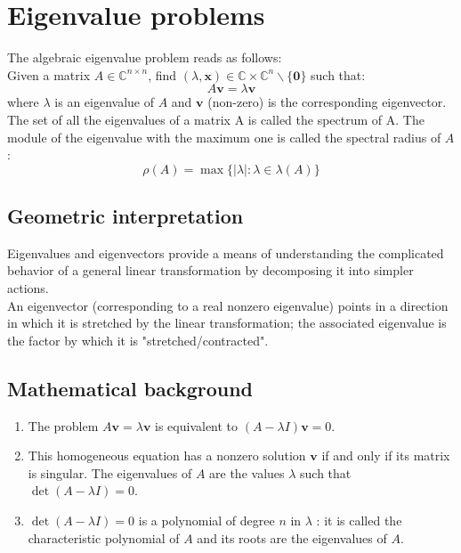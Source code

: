 \documentclass[11pt]{book}
\begin{document}
\newpage 
\chapter{Eigenvalue problems}
The algebraic eigenvalue problem reads as follows:\\
Given a matrix $A \in \mathbb{C}^{n \times n}$, find $(\lambda, \mathbf{x}) \in \mathbb{C} \times \mathbb{C}^{n} \backslash\{\mathbf{0}\}$ such that:
$$
A \mathbf{v}=\lambda \mathbf{v}
$$
where $\lambda$ is an eigenvalue of $A$ and $\mathbf{v}$ (non-zero) is the corresponding eigenvector.
The set of all the eigenvalues of a matrix $\mathrm{A}$ is called the spectrum of $\mathrm{A}.$
The module of the eigenvalue with the maximum one is called the spectral radius of $A$:
$$
\rho(A)=\max \{|\lambda|: \lambda \in \lambda(A)\}
$$

\section*{Geometric interpretation}
Eigenvalues and eigenvectors provide a means of understanding the complicated behavior of a general linear transformation by decomposing it into simpler actions.\\
An eigenvector (corresponding to a real nonzero eigenvalue) points in a direction in which it is stretched by the linear transformation; the associated eigenvalue is the factor by which it is "stretched/contracted".

\section*{Mathematical background}
\begin{enumerate}
  \item The problem $A \mathbf{v}=\lambda \mathbf{v}$ is equivalent to $(A-\lambda I) \mathbf{v}=0$.

  \item This homogeneous equation has a nonzero solution $\mathbf{v}$ if and only if its matrix is singular. The eigenvalues of $A$ are the values $\lambda$ such that $\operatorname{det}(A-\lambda I)=0$.

  \item $\operatorname{det}(A-\lambda I)=0$ is a polynomial of degree $n$ in $\lambda$ : it is called the characteristic polynomial of $A$ and its roots are the eigenvalues of $A$.

\end{enumerate}
\end{document}
